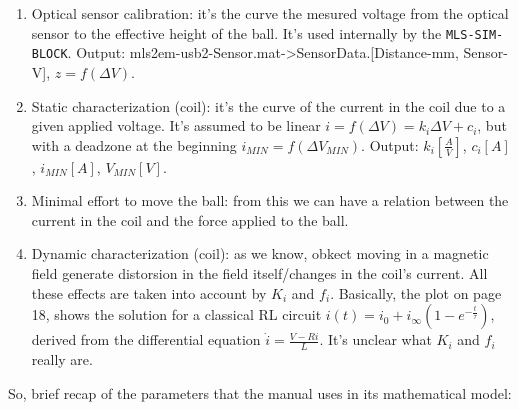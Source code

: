 \begin{enumerate}
    \item Optical sensor calibration: it's the curve the mesured voltage from the optical sensor to the effective height of the ball. It's used internally by the \texttt{MLS-SIM-BLOCK}. Output: mls2em-usb2-Sensor.mat->SensorData.[Distance-mm, Sensor-V], $z = f(\Delta V)$.
    \item Static characterization (coil): it's the curve of the current in the coil due to a given applied voltage. It's assumed to be linear $i = f(\Delta V) = k_i \Delta V  + c_i$, but with a deadzone at the beginning $i_{MIN} = f(\Delta V_{MIN})$. Output: $k_i [\frac{A}{V}]$, $c_i [A]$, $i_{MIN} [A]$, $V_{MIN} [V]$.
    \item Minimal effort to move the ball: from this we can have a relation between the current in the coil and the force applied to the ball.
    \item Dynamic characterization (coil): as we know, obkect moving in a magnetic field generate distorsion in the field itself/changes in the coil's current. All these effects are taken into account by $K_i$ and $f_i$. Basically, the plot on page 18, shows the solution for a classical RL circuit $i(t) = i_0 + i_{\infty} (1 - e^{-\frac{t}{\tau}})$, derived from the differential equation $\dot{i} = \frac{V - R i}{L}$. It's unclear what $K_i$ and $f_i$ really are.
\end{enumerate}


So, brief recap of the parameters that the manual uses in its mathematical model:

